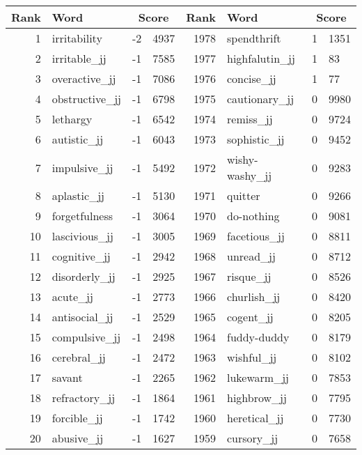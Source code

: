 \begin{table}[tbp]
    \begin{tabular}{| rlr@{.}l | rlr@{.}l |}
    \hline
    \textbf{Rank} & \textbf{Word} & \multicolumn{2}{c|}{\textbf{Score}} & \textbf{Rank} & \textbf{Word} & \multicolumn{2}{c|}{\textbf{Score}} \\
    \hline
    1 & irritability & -2 & 4937    &    1978 & spendthrift & 1 & 1351 \\
    2 & irritable\_jj & -1 & 7585    &    1977 & highfalutin\_jj & 1 & 83 \\
    3 & overactive\_jj & -1 & 7086    &    1976 & concise\_jj & 1 & 77 \\
    4 & obstructive\_jj & -1 & 6798    &    1975 & cautionary\_jj & 0 & 9980 \\
    5 & lethargy & -1 & 6542    &    1974 & remiss\_jj & 0 & 9724 \\
    6 & autistic\_jj & -1 & 6043    &    1973 & sophistic\_jj & 0 & 9452 \\
    7 & impulsive\_jj & -1 & 5492    &    1972 & wishy-washy\_jj & 0 & 9283 \\
    8 & aplastic\_jj & -1 & 5130    &    1971 & quitter & 0 & 9266 \\
    9 & forgetfulness & -1 & 3064    &    1970 & do-nothing & 0 & 9081 \\
    10 & lascivious\_jj & -1 & 3005    &    1969 & facetious\_jj & 0 & 8811 \\
    11 & cognitive\_jj & -1 & 2942    &    1968 & unread\_jj & 0 & 8712 \\
    12 & disorderly\_jj & -1 & 2925    &    1967 & risque\_jj & 0 & 8526 \\
    13 & acute\_jj & -1 & 2773    &    1966 & churlish\_jj & 0 & 8420 \\
    14 & antisocial\_jj & -1 & 2529    &    1965 & cogent\_jj & 0 & 8205 \\
    15 & compulsive\_jj & -1 & 2498    &    1964 & fuddy-duddy & 0 & 8179 \\
    16 & cerebral\_jj & -1 & 2472    &    1963 & wishful\_jj & 0 & 8102 \\
    17 & savant & -1 & 2265    &    1962 & lukewarm\_jj & 0 & 7853 \\
    18 & refractory\_jj & -1 & 1864    &    1961 & highbrow\_jj & 0 & 7795 \\
    19 & forcible\_jj & -1 & 1742    &    1960 & heretical\_jj & 0 & 7730 \\
    20 & abusive\_jj & -1 & 1627    &    1959 & cursory\_jj & 0 & 7658 \\

\end{tabular}
\end{table}
